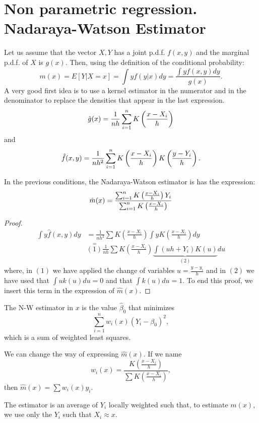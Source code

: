 \section{Non parametric regression. Nadaraya-Watson Estimator}

Let us assume that the vector \(X,Y\) has a joint p.d.f. \(f(x,y)\) and the marginal p.d.f. of \(X\) is \(g(x)\). Then, using the definition of the conditional probability:
\[
m(x) = E\left[Y| X = x\right] = \int y f(y|x) dy = \frac{\int y f(x,y) dy}{g(x)}.
\]
A very good first idea is to use a kernel estimator in the numerator and in the denominator to replace the densities that appear in the last expression.
\[
\hat g(x) = \frac{1}{nh} \sum_{i=1}^n K\left( \frac{{x} - {X}_i}{h}\right)
\]
and
\[
\hat{f}(x,y) = \frac{1}{nh^2} \sum_{i=1}^n K\left( \frac{{x} - {X}_i}{h}\right) K\left( \frac{{y} - {Y}_i}{h}\right).
\]

\begin{nprop}
In the previous conditions, the Nadaraya-Watson estimator is has the expression:
\[
\hat m(x) = \frac{\sum_{i=1}^n K\left( \frac{{x} - {X}_i}{h}\right)Y_i }{\sum_{i=1}^n K\left( \frac{{x} - {X}_i}{h}\right) }
\]
\end{nprop}
\begin{proof}
\begin{align*}
\int y \hat f(x,y) dy & = \frac{1}{nh^2} \sum K \left(\frac{x-X_i}{h}\right) \int y  K \left(\frac{x-X_i}{h}\right) dy \\
& \stackrel{=}{(1)} \frac{1}{nh} \sum K \left(\frac{x-X_i}{h}\right) \underbrace{\int(uh+Y_i) K(u)}_{(2)} du
\end{align*}
where, in \((1)\) we have applied the change of variables \(u = \frac{y-y_i}{h}\) and in \((2)\) we have used that \(\int uk(u)du = 0\) and that \(\int k(u)du =1\). To end this proof, we insert this term in the expression of \(\hat m(x)\).
\end{proof}

\begin{nprop}
The N-W estimator in \(x\) is the value \(\hat \beta_0\) that minimizes
\[
\sum_{i=1}^n w_i(x)(Y_i - \beta_0)^2,  
\]
which is a sum of weighted least squares.
\end{nprop}
We can change the way of expressing \(\hat m(x)\). If we name
\[
w_i(x) = \frac{ K \left(\frac{x-X_i}{h}\right)}{\sum  K \left(\frac{x-X_i}{h}\right)},
\]
then \(\hat m(x) = \sum w_i(x) y_i\).

\begin{remark}
The estimator is an average of \(Y_i\) locally weighted such that, to estimate \(m(x)\), we use only the \(Y_i\) such that \(X_i \approx x\).
\end{remark}

